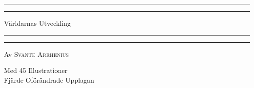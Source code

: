 \documentclass[a4paper, 12pt, oneside, swedish]{article}
\begin{document}
\renewcommand{\thefigure}{\color{Red}\Fontauri{\arabic{figure}}}
\renewcommand\thefootnote{\color{Red}\Fontauri{\arabic{footnote}}}

\let\oldfootnote\footnote
    \renewcommand{\footnote}[1]{\oldfootnote{\color{Red}\Fontauri\large#1}}
\begin{titlepage} %
	\centering %
	\scshape %

	
	\rule{\textwidth}{1.6pt}\vspace*{-\baselineskip}\vspace*{2pt} %
	\rule{\textwidth}{0.4pt} %
	
	\vspace{0.75\baselineskip} %

        {\Huge Världarnas Utveckling \\} %
	
	\vspace{0.75\baselineskip} %
	
	\rule{\textwidth}{0.4pt}\vspace*{-\baselineskip}\vspace{3.2pt} %
	\rule{\textwidth}{1.6pt} %
	
	\vspace{1\baselineskip} %
	
	
	{Av \scshape\Large Svante Arrhenius \\} %
	
	\vspace*{1\baselineskip} %
	


	\vspace{1\baselineskip} %

        {\small Med 45 Illustrationer \\Fjärde Oförändrade Upplagan}


\end{titlepage}
\end{document}
